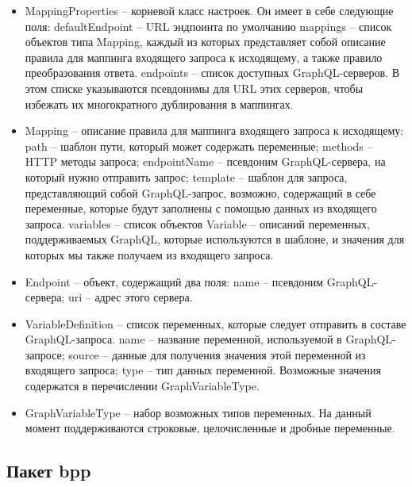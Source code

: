 \begin{itemize}
	\item MappingProperties -- корневой класс настроек.
	Он имеет в себе следующие поля:
		\subitem defaultEndpoint -- URL эндпоинта по умолчанию
		\subitem mappings -- список объектов типа Mapping, каждый из которых представляет собой описание правила для маппинга входящего запроса к исходящему, а также правило преобразования ответа.
		\subitem endpoints -- список доступных GraphQL-серверов.
		В этом списке указываются псевдонимы для URL этих серверов, чтобы избежать их многократного дублирования в маппингах.

	\item Mapping -- описание правила для маппинга входящего запроса к исходящему:
		\subitem path -- шаблон пути, который может содержать переменные;
		\subitem methods -- HTTP методы запроса;
		\subitem endpointName -- псевдоним GraphQL-сервера, на который нужно отправить запрос;
		\subitem template -- шаблон для запроса, представляющий собой GraphQL-запрос, возможно, содержащий в себе переменные, которые будут заполнены с помощью данных из входящего запроса.
		\subitem variables -- список объектов Variable -- описаний переменных, поддерживаемых GraphQL, которые используются в шаблоне, и значения для которых мы также получаем из входящего запроса.

	\item Endpoint -- объект, содержащий два поля:
		\subitem name -- псевдоним GraphQL-сервера;
		\subitem uri -- адрес этого сервера.

	\item VariableDefinition -- список переменных, которые следует отправить в составе GraphQL-запроса.
		\subitem name -- название переменной, используемой в GraphQL-запросе;
		\subitem source -- данные для получения значения этой переменной из входящего запроса;
		\subitem type -- тип данных переменной.
			Возможные значения содержатся в перечислении GraphVariableType.

	\item GraphVariableType -- набор возможных типов переменных.
		На данный момент поддерживаются строковые, целочисленные и дробные переменные.

\end{itemize}

\subsection{Пакет bpp}\label{subsec:package-bpp}

